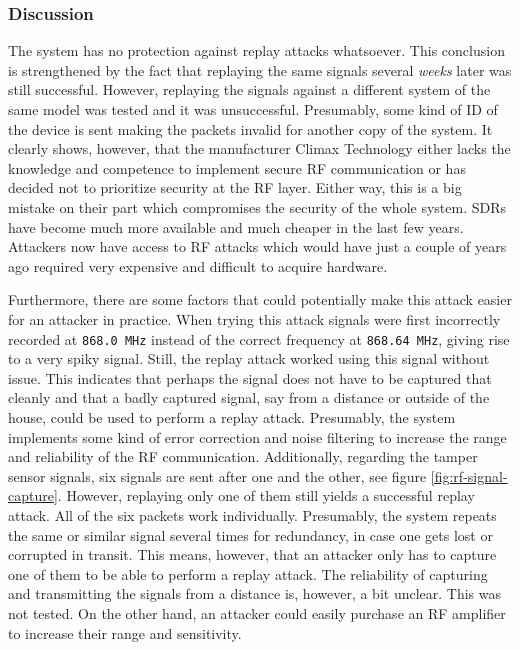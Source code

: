 \subsubsection{Discussion}
The system has no protection against replay attacks whatsoever. This conclusion is strengthened by the fact that replaying the same signals several \textit{weeks} later was still successful. However, replaying the signals against a different system of the same model was tested and it was unsuccessful. Presumably, some kind of ID of the device is sent making the packets invalid for another copy of the system. It clearly shows, however, that the manufacturer Climax Technology either lacks the knowledge and competence to implement secure RF communication or has decided not to prioritize security at the RF layer. Either way, this is a big mistake on their part which compromises the security of the whole system. SDRs have become much more available and much cheaper in the last few years. Attackers now have access to RF attacks which would have just a couple of years ago required very expensive and difficult to acquire hardware.

Furthermore, there are some factors that could potentially make this attack easier for an attacker in practice. When trying this attack signals were first incorrectly recorded at \texttt{868.0 MHz} instead of the correct frequency at \texttt{868.64 MHz}, giving rise to a very spiky signal. Still, the replay attack worked using this signal without issue. This indicates that perhaps the signal does not have to be captured that cleanly and that a badly captured signal, say from a distance or outside of the house, could be used to perform a replay attack. Presumably, the system implements some kind of error correction and noise filtering to increase the range and reliability of the RF communication. Additionally, regarding the tamper sensor signals, six signals are sent after one and the other, see figure \ref{fig:rf-signal-capture}. However, replaying only one of them still yields a successful replay attack. All of the six packets work individually. Presumably, the system repeats the same or similar signal several times for redundancy, in case one gets lost or corrupted in transit. This means, however, that an attacker only has to capture one of them to be able to perform a replay attack. The reliability of capturing and transmitting the signals from a distance is, however, a bit unclear. This was not tested. On the other hand, an attacker could easily purchase an RF amplifier to increase their range and sensitivity.

